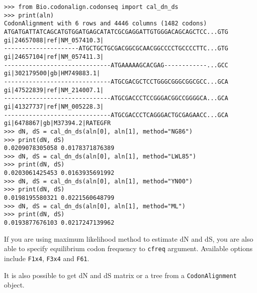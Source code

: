 \documentclass{article}
\begin{document}
\begin{verbatim}
>>> from Bio.codonalign.codonseq import cal_dn_ds
>>> print(aln)
CodonAlignment with 6 rows and 4446 columns (1482 codons)
ATGATGATTATCAGCATGTGGATGAGCATATCGCGAGGATTGTGGGACAGCAGCTCC...GTG gi|24657088|ref|NM_057410.3|
---------------------ATGCTGCTGCGACGGCGCAACGGCCCCTGCCCCTTC...GTG gi|24657104|ref|NM_057411.3|
------------------------------ATGAAAAAGCACGAG------------...GCC gi|302179500|gb|HM749883.1|
------------------------------ATGCGACGCTCCTGGGCGGGCGGCGCC...GCA gi|47522839|ref|NM_214007.1|
------------------------------ATGCGACCCTCCGGGACGGCCGGGGCA...GCA gi|41327737|ref|NM_005228.3|
------------------------------ATGCGACCCTCAGGGACTGCGAGAACC...GCA gi|6478867|gb|M37394.2|RATEGFR
>>> dN, dS = cal_dn_ds(aln[0], aln[1], method="NG86")
>>> print(dN, dS)
0.0209078305058 0.0178371876389
>>> dN, dS = cal_dn_ds(aln[0], aln[1], method="LWL85")
>>> print(dN, dS)
0.0203061425453 0.0163935691992
>>> dN, dS = cal_dn_ds(aln[0], aln[1], method="YN00")
>>> print(dN, dS)
0.0198195580321 0.0221560648799
>>> dN, dS = cal_dn_ds(aln[0], aln[1], method="ML")
>>> print(dN, dS)
0.0193877676103 0.0217247139962
\end{verbatim}

If you are using maximum likelihood method to estimate dN and dS, you
are also able to specify equilibrium codon frequency to \texttt{cfreq}
argument. Available options include \texttt{F1x4}, \texttt{F3x4} and
\texttt{F61}.

It is also possible to get dN and dS matrix or a tree from a
\texttt{CodonAlignment} object.
\end{document}
